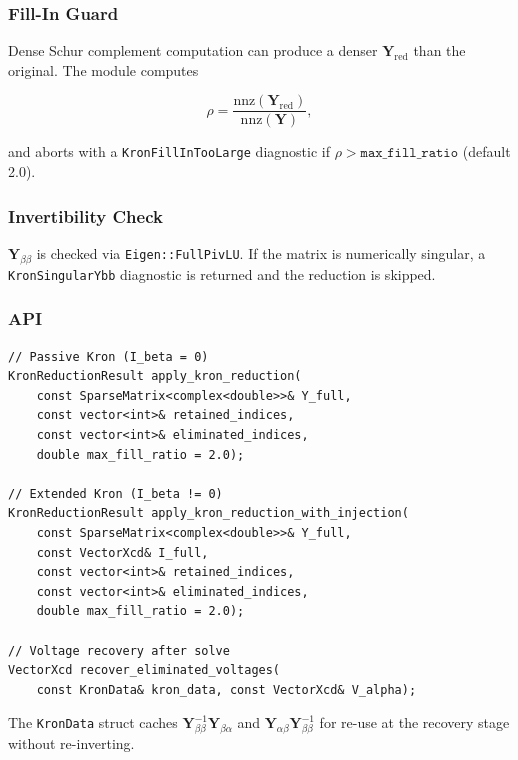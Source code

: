 \subsubsection{Fill-In Guard}

Dense Schur complement computation can produce a denser $\mathbf{Y}_{\text{red}}$
than the original.  The module computes

\begin{equation}
  \rho = \frac{\mathrm{nnz}(\mathbf{Y}_{\text{red}})}
              {\mathrm{nnz}(\mathbf{Y})},
\end{equation}

and aborts with a \texttt{KronFillInTooLarge} diagnostic if
$\rho > \texttt{max\_fill\_ratio}$ (default 2.0).

\subsubsection{Invertibility Check}

$\mathbf{Y}_{\beta\beta}$ is checked via \texttt{Eigen::FullPivLU}.  If the
matrix is numerically singular, a \texttt{KronSingularYbb} diagnostic is
returned and the reduction is skipped.

\subsubsection{API}

\begin{verbatim}
// Passive Kron (I_beta = 0)
KronReductionResult apply_kron_reduction(
    const SparseMatrix<complex<double>>& Y_full,
    const vector<int>& retained_indices,
    const vector<int>& eliminated_indices,
    double max_fill_ratio = 2.0);

// Extended Kron (I_beta != 0)
KronReductionResult apply_kron_reduction_with_injection(
    const SparseMatrix<complex<double>>& Y_full,
    const VectorXcd& I_full,
    const vector<int>& retained_indices,
    const vector<int>& eliminated_indices,
    double max_fill_ratio = 2.0);

// Voltage recovery after solve
VectorXcd recover_eliminated_voltages(
    const KronData& kron_data, const VectorXcd& V_alpha);
\end{verbatim}

The \texttt{KronData} struct caches
$\mathbf{Y}_{\beta\beta}^{-1}\mathbf{Y}_{\beta\alpha}$ and
$\mathbf{Y}_{\alpha\beta}\mathbf{Y}_{\beta\beta}^{-1}$ for re-use at the
recovery stage without re-inverting.

